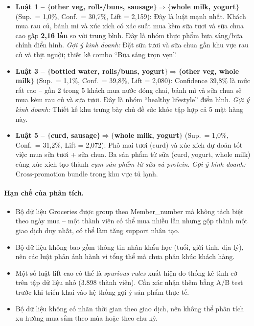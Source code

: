 \documentclass[12pt,a4paper]{report}
\begin{document}
\begin{itemize}
    \item \textbf{Luật 1 -- $\{$other veg, rolls/buns, sausage$\} \Rightarrow \{$whole milk, yogurt$\}$}
          (Sup.\ = 1{,}0\%, Conf.\ = 30{,}7\%, Lift = 2{,}159):
          Đây là luật mạnh nhất. Khách mua rau củ, bánh mì và xúc xích có xác suất mua
          kèm sữa tươi và sữa chua cao gấp \textbf{2{,}16 lần} so với trung bình.
          Đây là nhóm thực phẩm bữa sáng/bữa chính điển hình.
          \textit{Gợi ý kinh doanh:} Đặt sữa tươi và sữa chua gần khu vực rau củ
          và thịt nguội; thiết kế combo ``Bữa sáng trọn vẹn''.

    \item \textbf{Luật 3 -- $\{$bottled water, rolls/buns, yogurt$\} \Rightarrow \{$other veg, whole milk$\}$}
          (Sup.\ = 1{,}1\%, Conf.\ = 39{,}8\%, Lift = 2{,}080):
          Confidence 39{,}8\% là mức rất cao -- gần 2 trong 5 khách mua nước đóng chai,
          bánh mì và sữa chua sẽ mua kèm rau củ và sữa tươi. Đây là nhóm ``healthy
          lifestyle'' điển hình. \textit{Gợi ý kinh doanh:} Thiết kế khu trưng bày
          chủ đề sức khỏe tập hợp cả 5 mặt hàng này.

    \item \textbf{Luật 5 -- $\{$curd, sausage$\} \Rightarrow \{$whole milk, yogurt$\}$}
          (Sup.\ = 1{,}0\%, Conf.\ = 31{,}2\%, Lift = 2{,}072):
          Phô mai tươi (curd) và xúc xích dự đoán tốt việc mua sữa tươi + sữa chua.
          Ba sản phẩm từ sữa (curd, yogurt, whole milk) cùng xúc xích tạo thành
          \textit{cụm sản phẩm từ sữa và protein}.
          \textit{Gợi ý kinh doanh:} Cross-promotion bundle trong khu vực tủ lạnh.
\end{itemize}

\paragraph{Hạn chế của phân tích.}
\begin{itemize}
    \item Bộ dữ liệu Groceries được group theo Member\_number mà không tách biệt
          theo ngày mua -- một thành viên có thể mua nhiều lần nhưng gộp thành một
          giao dịch duy nhất, có thể làm tăng support nhân tạo.
    \item Bộ dữ liệu không bao gồm thông tin nhân khẩu học (tuổi, giới tính,
          địa lý), nên các luật phản ánh hành vi tổng thể mà chưa phân khúc khách hàng.
    \item Một số luật lift cao có thể là \textit{spurious rules} xuất hiện do thống
          kê tình cờ trên tập dữ liệu nhỏ (3.898 thành viên). Cần xác nhận thêm
          bằng A/B test trước khi triển khai vào hệ thống gợi ý sản phẩm thực tế.
    \item Bộ dữ liệu không có nhãn thời gian theo giao dịch, nên không thể phân
          tích xu hướng mua sắm theo mùa hoặc theo chu kỳ.
\end{itemize}
\end{document}
